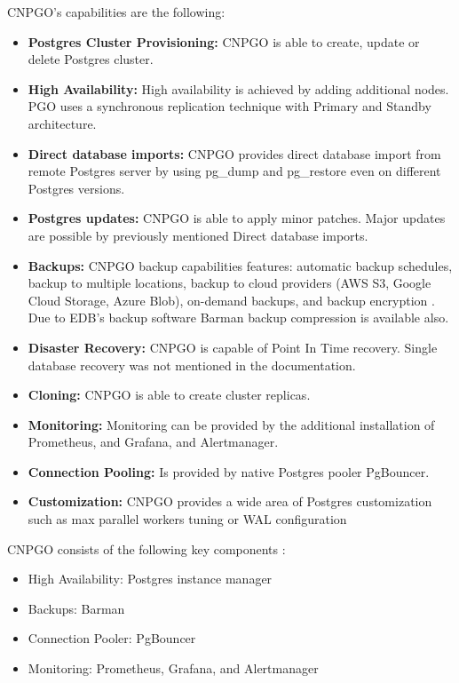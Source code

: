 CNPGO’s capabilities are the following:
\begin{itemize}
    \item \textbf{Postgres Cluster Provisioning:} CNPGO is able to create, update or delete Postgres cluster. \cite{CNPGdocuCapabilityLevels}
    \item \textbf{High Availability:} High availability is achieved by adding additional nodes. PGO uses a synchronous replication technique with Primary and Standby architecture. \cite{CNPGdocuReplication}
    \item \textbf{Direct database imports:} CNPGO provides direct database import from remote Postgres server by using pg\_dump and pg\_restore even on different Postgres versions. \cite{CNPGdocuDatabaseImports}
    \item \textbf{Postgres updates:} CNPGO is able to apply minor patches. \cite{CNPGdocuUpdates} Major updates are possible by previously mentioned Direct database imports.
    \item \textbf{Backups:} CNPGO backup capabilities features: automatic backup schedules, backup to multiple locations, backup to cloud providers (AWS S3, Google Cloud Storage, Azure Blob), on-demand backups, and backup encryption \cite{CNPGdocuBackup}\cite{CNPGdocuTDE}. Due to EDB’s backup software Barman backup compression is available also. \cite{CNPGdocuBackup}
    \item \textbf{Disaster Recovery:} CNPGO is capable of Point In Time recovery. Single database recovery was not mentioned in the documentation. \cite{CNPGdocuBackup}
    \item \textbf{Cloning:} CNPGO is able to create cluster replicas. \cite{CNPGdocuReplication}
    \item \textbf{Monitoring:} Monitoring can be provided by the additional installation of Prometheus, and Grafana, and Alertmanager. \cite{CNPGdocuQuickstart}
    \item \textbf{Connection Pooling:} Is provided by native Postgres pooler PgBouncer. \cite{CNPGdocuConnectionPooling}
    \item \textbf{Customization:} CNPGO provides a wide area of Postgres customization such as max parallel workers tuning or WAL configuration \cite{CNPGdocuConfiguration}
\end{itemize}


CNPGO consists of the following key components \cite{PostgresOnKubernetes} \cite{CNPGdocuQuickstart}:
\begin{itemize}
    \item High Availability: Postgres instance manager
    \item Backups: Barman
    \item Connection Pooler: PgBouncer
    \item Monitoring: Prometheus, Grafana, and Alertmanager
\end{itemize}

